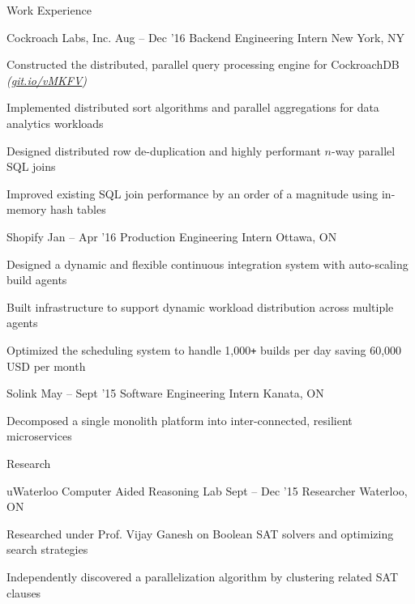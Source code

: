 \documentclass{resume} %
\begin{document}
\begin{rSection}{Work Experience}
  \begin{rSubsection}{Cockroach Labs, Inc.}
                     {Aug -- Dec '16}
                     {Backend Engineering Intern}
                     {New York, NY}

    \item Constructed the distributed, parallel query processing engine for
      CockroachDB {\em (\href{https://git.io/vMKFV}{git.io/vMKFV})}
    \item Implemented distributed sort algorithms and parallel aggregations for
      data analytics workloads
    \item Designed distributed row de-duplication and highly performant $n$-way
      parallel SQL joins
    \item Improved existing SQL join performance by an order of a magnitude
      using in-memory hash tables
  \end{rSubsection}

  \begin{rSubsection}{Shopify}
                     {Jan -- Apr '16}
                     {Production Engineering Intern}
                     {Ottawa, ON}

  \item Designed a dynamic and flexible continuous integration system with
    auto-scaling build agents
  \item Built infrastructure to support dynamic workload distribution across
    multiple agents
  \item Optimized the scheduling system to handle 1,000\texttt{+} builds per
    day saving 60,000 USD per month
  \end{rSubsection}

  \begin{rSubsection}{Solink}
                     {May -- Sept '15}
                     {Software Engineering Intern}
                     {Kanata, ON}

    \item Decomposed a single monolith platform into inter-connected, resilient
      microservices
  \end{rSubsection}
\end{rSection}


\begin{rSection}{Research}
  \begin{rSubsection}{uWaterloo Computer Aided Reasoning Lab}
                     {Sept -- Dec '15}
                     {Researcher}
                     {Waterloo, ON}
    \item Researched under Prof. Vijay Ganesh on Boolean SAT solvers and optimizing
      search strategies
    \item Independently discovered a parallelization algorithm by clustering
      related SAT clauses
  \end{rSubsection}
\end{rSection}
\end{document}
